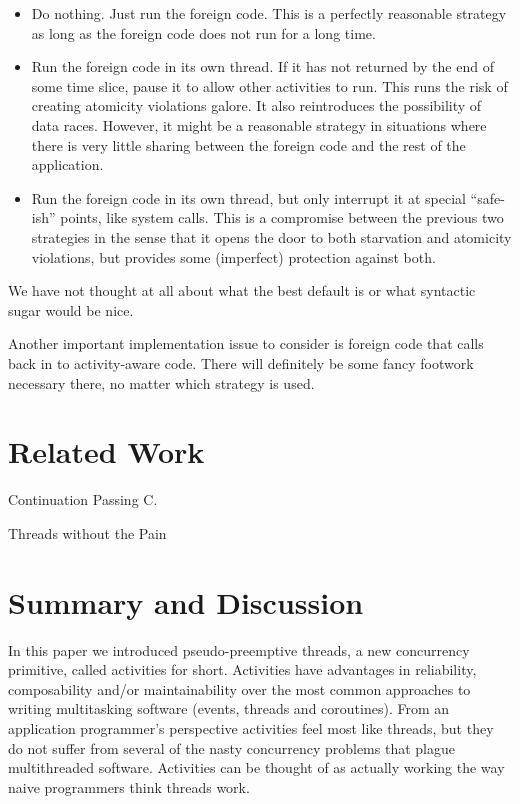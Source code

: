 \documentclass[10pt,preprint]{sigplanconf}
\begin{document}
\begin{itemize}
\item Do nothing.
  Just run the foreign code.
  This is a perfectly reasonable strategy as long as the foreign code does not run for a long time.
\item Run the foreign code in its own thread.
  If it has not returned by the end of some time slice, pause it to allow other activities to run.
  This runs the risk of creating atomicity violations galore.
  It also reintroduces the possibility of data races.
  However, it might be a reasonable strategy in situations where there is very little sharing between the foreign code and the rest of the application.
\item Run the foreign code in its own thread, but only interrupt it at special ``safe-ish'' points, like system calls.
  This is a compromise between the previous two strategies in the sense that it opens the door to both starvation and atomicity violations, but provides some (imperfect) protection against both.
\end{itemize}

We have not thought at all about what the best default is or what syntactic sugar would be nice.

Another important implementation issue to consider is foreign code that calls back in to activity-aware code.
There will definitely be some fancy footwork necessary there, no matter which strategy is used.

\section{Related Work}

Continuation Passing C.

Threads without the Pain

\section{Summary and Discussion}

In this paper we introduced pseudo-preemptive threads, a new concurrency primitive, called activities for short.
Activities have advantages in reliability, composability and/or maintainability over the most common approaches to writing multitasking software (events, threads and coroutines).
From an application programmer's perspective activities feel most like threads, but they do not suffer from several of the nasty concurrency problems that plague multithreaded software.
Activities can be thought of as actually working the way naive programmers think threads work.
\end{document}
